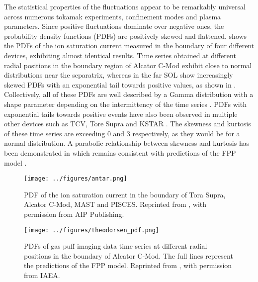 The statistical properties of the fluctuations appear to be remarkably universal across
numerous tokamak experiments, confinement modes and plasma parameters. Since positive
fluctuations dominate over negative ones, the probability density functions (PDFs) are
positively skewed and flattened.  shows the PDFs of the ion saturation
current measured in the boundary of four different devices, exhibiting almost identical
results. Time series obtained at different radial positions in the boundary region of
Alcator C-Mod exhibit close to normal distributions near the separatrix, whereas in the
far SOL show increasingly skewed PDFs with an exponential tail towards positive values,
as shown in . Collectively, all of these PDFs are well
described by a Gamma distribution with a shape parameter depending on the intermittency
of the time series \cite{theodorsen2017relationship}. PDFs with exponential tails
towards positive events have also been observed in multiple other devices such as TCV,
Tore Supra and KSTAR
\cite{antar2001turbulence,antar2003universality,graves2005self,garcia2007fluctuations,garcia2007collisionality,garcia2009blob,garcia2017sol}.
The skewness and kurtosis of these time series are exceeding 0 and 3 respectively, as
they would be for a normal distribution. A parabolic relationship between skewness and
kurtosis has been demonstrated in
\cite{labit2007universal,sattin2009statistics,sattin2009parabolic} which remains
consistent with predictions of the FPP model \cite{garcia2016stochastic}.
\begin{figure}
  \centering
  \begin{minipage}{.48\linewidth}
    \texttt{[image: ../figures/antar.png]}
    \caption{PDF of the ion saturation current in the boundary of Tora Supra, Alcator C-Mod, MAST and PISCES. Reprinted from \cite{antar2003universality}, with permission from AIP Publishing.}
    \label{Fig:antar}
  \end{minipage}
  \hfill
  \begin{minipage}{.48\linewidth}
    \texttt{[image: ../figures/theodorsen\_pdf.png]}
    \caption{PDFs of gas puff imaging data time series at different radial positions in the boundary of Alcator C-Mod. The full lines represent the predictions of the FPP model. Reprinted from \cite{theodorsen2017relationship}, with permission from IAEA.}
    \label{Fig:theodorsen_pdf}
  \end{minipage}
\end{figure}

